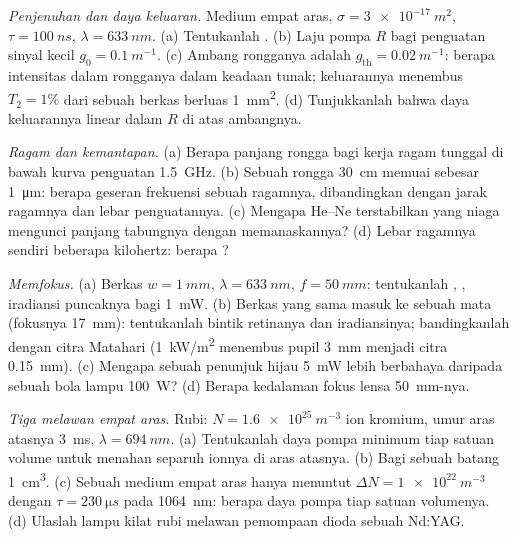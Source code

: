\begin{exercise}[$\star\star$]\label{exo:b2:laser:6}
\emph{Penjenuhan dan daya keluaran.} Medium empat aras, $\sigma =
\qty{3e-17}{m^2}$, $\tau = \qty{100}{ns}$, $\lambda = \qty{633}{nm}$.
(a) Tentukanlah . (b) Laju pompa $R$ bagi penguatan sinyal kecil
$g_0 = \qty{0.1}{m^{-1}}$. (c) Ambang rongganya adalah
$g_{\text{th}} = \qty{0.02}{m^{-1}}$: berapa intensitas dalam rongganya dalam keadaan
tunak; keluarannya menembus $T_2 = 1\%$ dari sebuah berkas berluas \qty{1}{mm^2}.
(d) Tunjukkanlah bahwa daya keluarannya linear dalam $R$ di atas ambangnya.
\end{exercise}

\begin{exercise}[$\star\star$]\label{exo:b2:laser:7}
\emph{Ragam dan kemantapan.} (a) Berapa panjang rongga bagi kerja ragam tunggal
di bawah kurva penguatan \qty{1.5}{GHz}. (b) Sebuah rongga \qty{30}{cm} memuai
sebesar \qty{1}{\micro m}: berapa geseran frekuensi sebuah ragamnya, dibandingkan dengan
jarak ragamnya dan lebar penguatannya. (c) Mengapa  He--Ne terstabilkan yang niaga
mengunci panjang tabungnya dengan memanaskannya? (d) Lebar ragamnya sendiri
beberapa kilohertz: berapa ?
\end{exercise}

\begin{exercise}[$\star\star$]\label{exo:b2:laser:8}
\emph{Memfokus.} (a) Berkas $w = \qty{1}{mm}$, $\lambda = \qty{633}{nm}$,
$f = \qty{50}{mm}$: tentukanlah , , iradiansi puncaknya bagi
\qty{1}{mW}. (b) Berkas yang sama masuk ke sebuah mata (fokusnya \qty{17}{mm}):
tentukanlah bintik retinanya dan iradiansinya; bandingkanlah dengan citra Matahari
(\qty{1}{kW/m^2} menembus pupil \qty{3}{mm} menjadi citra \qty{0.15}{mm}).
(c) Mengapa sebuah penunjuk hijau \qty{5}{mW} lebih berbahaya daripada sebuah
bola lampu \qty{100}{W}? (d) Berapa kedalaman fokus lensa \qty{50}{mm}-nya.
\end{exercise}

\begin{exercise}[$\star\star$]\label{exo:b2:laser:9}
\emph{Tiga melawan empat aras.} Rubi: $N = \qty{1.6e25}{m^{-3}}$
ion kromium, umur aras atasnya \qty{3}{ms}, $\lambda =
\qty{694}{nm}$. (a) Tentukanlah daya pompa minimum tiap satuan volume untuk menahan separuh
ionnya di aras atasnya. (b) Bagi sebuah batang \qty{1}{cm^3}. (c) Sebuah medium
empat aras hanya menuntut $\Delta N = \qty{1e22}{m^{-3}}$ dengan $\tau =
\qty{230}{\micro s}$ pada \qty{1064}{nm}: berapa daya pompa tiap satuan volumenya. (d) Ulaslah
lampu kilat  rubi melawan pemompaan dioda sebuah Nd:YAG.
\end{exercise}

